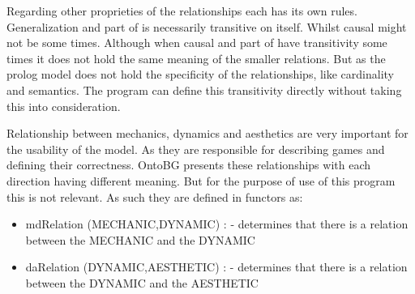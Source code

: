 Regarding other proprieties of the relationships each has its own rules. Generalization and part of is necessarily transitive on itself. Whilst causal might not be some times. Although when causal and part of have transitivity some times it does not hold the same meaning of the smaller relations. But as the prolog model does not hold the specificity of the relationships, like cardinality and semantics. The program can define this transitivity directly without taking this into consideration.

Relationship between mechanics, dynamics and aesthetics are very important for the usability of the model. As they are responsible for describing games and defining their correctness. OntoBG presents these relationships with each direction having different meaning. But for the purpose of use of this program this is not relevant. As such they are defined in functors as:
\begin{itemize}
    \item mdRelation (MECHANIC,DYNAMIC) : - determines that there is a relation between the MECHANIC and the DYNAMIC
    \item daRelation (DYNAMIC,AESTHETIC) : - determines that there is a relation between the DYNAMIC and the AESTHETIC
\end{itemize}